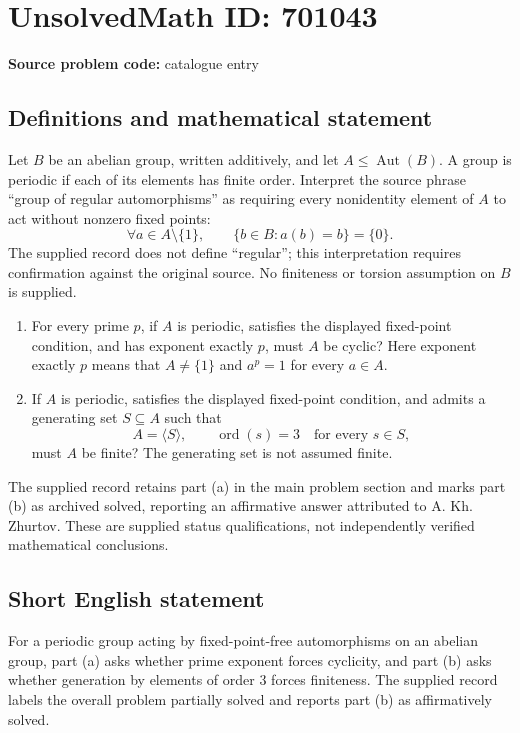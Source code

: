 \documentclass[11pt]{article}
\begin{document}
\section*{UnsolvedMath ID: 701043}
\textbf{Source problem code:} catalogue entry
\subsection{Definitions and mathematical statement}
Let \(B\) be an abelian group, written additively, and let \(A\leq\operatorname{Aut}(B)\). A group is periodic if each of its elements has finite order. Interpret the source phrase ``group of regular automorphisms'' as requiring every nonidentity element of \(A\) to act without nonzero fixed points:
\[
\forall a\in A\setminus\{1\},\qquad \{b\in B:a(b)=b\}=\{0\}.
\]
The supplied record does not define ``regular''; this interpretation requires confirmation against the original source. No finiteness or torsion assumption on \(B\) is supplied.

\begin{enumerate}
\item[(a)] For every prime \(p\), if \(A\) is periodic, satisfies the displayed fixed-point condition, and has exponent exactly \(p\), must \(A\) be cyclic? Here exponent exactly \(p\) means that \(A\neq\{1\}\) and \(a^p=1\) for every \(a\in A\).
\item[(b)] If \(A\) is periodic, satisfies the displayed fixed-point condition, and admits a generating set \(S\subseteq A\) such that
\[
A=\langle S\rangle,\qquad \operatorname{ord}(s)=3\quad\text{for every }s\in S,
\]
must \(A\) be finite? The generating set is not assumed finite.
\end{enumerate}
The supplied record retains part (a) in the main problem section and marks part (b) as archived solved, reporting an affirmative answer attributed to A. Kh. Zhurtov. These are supplied status qualifications, not independently verified mathematical conclusions.
\subsection{Short English statement}
For a periodic group acting by fixed-point-free automorphisms on an abelian group, part (a) asks whether prime exponent forces cyclicity, and part (b) asks whether generation by elements of order \(3\) forces finiteness. The supplied record labels the overall problem partially solved and reports part (b) as affirmatively solved.
\end{document}
